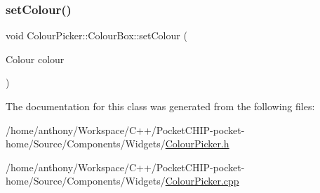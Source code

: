 \mbox{\label{classColourPicker_1_1ColourBox_a9d3cdd11b9949c6e23d429fd5288110a}} 
\subsubsection{\texorpdfstring{set\+Colour()}{setColour()}}
{\footnotesize\ttfamily void Colour\+Picker\+::\+Colour\+Box\+::set\+Colour (\begin{DoxyParamCaption}\item[{Colour}]{colour }\end{DoxyParamCaption})}



The documentation for this class was generated from the following files\+:\begin{DoxyCompactItemize}
\item 
/home/anthony/\+Workspace/\+C++/\+Pocket\+C\+H\+I\+P-\/pocket-\/home/\+Source/\+Components/\+Widgets/\mbox{\hyperlink{ColourPicker_8h}{Colour\+Picker.\+h}}\item 
/home/anthony/\+Workspace/\+C++/\+Pocket\+C\+H\+I\+P-\/pocket-\/home/\+Source/\+Components/\+Widgets/\mbox{\hyperlink{ColourPicker_8cpp}{Colour\+Picker.\+cpp}}\end{DoxyCompactItemize}

